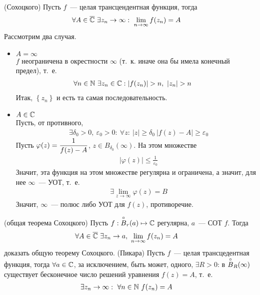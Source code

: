 \theorem (Сохоцкого)
Пусть $f$~--- целая трансцендентная функция, тогда
\begin{align*}
  & \forall A \in \overline{\mathbb{C}} \ \exists z_n \to \infty: \ \lim_{n \to \infty}f(z_n) = A
\end{align*}
\pr
Рассмотрим два случая.
\begin{itemize}
    \item $A = \infty$
    \\
    $f$ неограничена в окрестности $\infty$ (т.~к. иначе она бы имела конечный
    предел), т.~е.
    \begin{align*}
      & \forall n \in \NN \ \exists z_n \in \CC: \left| f(z_n) \right|> n, \ \left| z_n \right| > n
    \end{align*}
    Итак, $\left\{ z_n \right\}$ и есть та самая последовательность.
    \item $A \in \mathbb{C}$
    \\
    Пусть, от противного,
    \begin{align*}
      & \exists \delta_0 > 0, \ \varepsilon_0 > 0: \ \forall z: \ \left| z \right| \geq \delta_0 \ \left| f(z) - A \right| \geq \varepsilon_0
    \end{align*}
    Пусть $\varphi(z) = \displaystyle \frac{1}{f(z) - A}$, $z \in B_{\delta_0}(\infty)$.
    На этом множестве
    \begin{align*}
      & \left| \varphi(z) \right| \leq \frac{1}{\varepsilon_0}
    \end{align*}
    Значит, эта функция на этом множестве регулярна и ограничена, а значит, для
    нее $\infty$~--- УОТ, т.~е.
    \begin{align*}
      & \exists \lim_{z \to \infty}\varphi(z) = B
    \end{align*}
    Значит, $\infty$~--- полюс либо УОТ для $f(z)$, противоречие.
\end{itemize}
\theorem (общая теорема Сохоцкого)
Пусть $f: \overset{\circ}{B}_r(a) \mapsto \mathbb{C}$ регулярна, $a$~--- СОТ $f$. Тогда
\begin{align*}
  & \forall A \in \overline{\mathbb{C}} \ \exists z_n \to a, \ \lim_{n \to \infty} f(z_n) = A
\end{align*}
\Exse
доказать общую теорему Сохоцкого.
\theorem (Пикара)
Пусть $f$~--- целая трансцедентная функция, тогда $\forall a \in \mathbb{C}$, за
исключением, быть может, одного, $\exists R > 0$: в $\overset{\circ}{B}_R(\infty)$
существует бесконечное число решений уравнения $f(z) = A$, т.~е.
\begin{align*}
  & \exists z_n \to \infty: \ \forall n \in \mathbb{N} \ f(z_n) = A
\end{align*}
